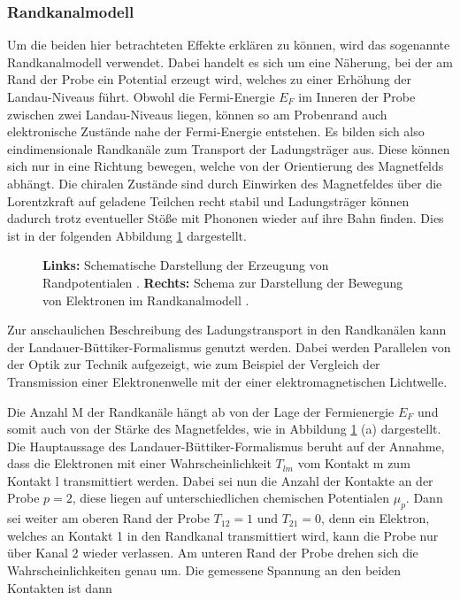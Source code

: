 \subsubsection{Randkanalmodell}

Um die beiden hier betrachteten Effekte erklären zu können, wird das sogenannte Randkanalmodell verwendet. Dabei handelt es sich um eine Näherung, bei der am Rand der Probe ein Potential erzeugt wird, welches zu einer Erhöhung der Landau-Niveaus führt. Obwohl die Fermi-Energie $E_F$ im Inneren der Probe zwischen zwei Landau-Niveaus liegen, können so am Probenrand auch elektronische Zustände nahe der Fermi-Energie entstehen. Es bilden sich also eindimensionale Randkanäle zum Transport der Ladungsträger aus. Diese können sich nur in eine Richtung bewegen, welche von der Orientierung des Magnetfelds abhängt. Die chiralen Zustände sind durch Einwirken des Magnetfeldes über die Lorentzkraft auf geladene Teilchen recht stabil und Ladungsträger können dadurch trotz  eventueller Stöße mit Phononen wieder auf ihre Bahn finden. Dies ist in der folgenden Abbildung \ref{fig:Randkanalmodell_Anleitungsheft} dargestellt.

\begin{figure}[h]
	\centering
	\caption[Schema Randkanalmodell]{\textbf{Links:} Schematische Darstellung der Erzeugung von Randpotentialen \cite{anleitung}. \textbf{Rechts:} Schema zur Darstellung der Bewegung von Elektronen im Randkanalmodell \cite{anleitung}.}
	\label{fig:Randkanalmodell_Anleitungsheft}
\end{figure}

Zur anschaulichen Beschreibung des Ladungstransport in den Randkanälen kann der Landauer-Büttiker-Formalismus genutzt werden. 
Dabei werden Parallelen von der Optik zur Technik aufgezeigt, wie zum Beispiel der Vergleich der Transmission einer Elektronenwelle mit der einer elektromagnetischen Lichtwelle. 

Die Anzahl M der Randkanäle hängt ab von der Lage der Fermienergie $E_F$ und somit auch von der Stärke des Magnetfeldes, wie in Abbildung \ref{fig:Randkanalmodell_Anleitungsheft} (a) dargestellt.
Die Hauptaussage des Landauer-Büttiker-Formalismus beruht auf der Annahme, dass die Elektronen mit einer Wahrscheinlichkeit $T_{lm}$ vom Kontakt m zum Kontakt l transmittiert werden. Dabei sei nun die Anzahl der Kontakte an der Probe $p=2$, diese liegen auf unterschiedlichen chemischen Potentialen $\mu_p$. Dann sei weiter am oberen Rand der Probe $T_{12}=1$ und $T_{21}=0$, denn ein Elektron, welches an Kontakt 1 in den Randkanal transmittiert wird, kann die Probe nur über Kanal 2 wieder verlassen. Am unteren Rand der Probe drehen sich die Wahrscheinlichkeiten genau um.  
Die gemessene Spannung an den beiden Kontakten ist dann

